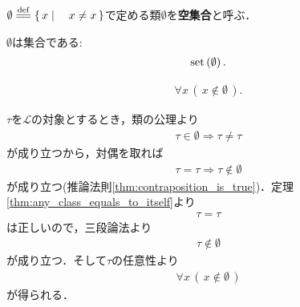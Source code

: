	\begin{screen}
		\begin{dfn}[空集合]
			$\emptyset \defeq \Set{x}{x \neq x}$で定める類$\emptyset$を{\bf 空集合}と呼ぶ．
		\end{dfn}
	\end{screen}
	
	\begin{screen}
		\begin{axm}[空集合の公理]
			$\emptyset$は集合である:
			\begin{align}
				\operatorname*{set} \left(\emptyset\right).
			\end{align}
		\end{axm}
	\end{screen}
	
	\begin{screen}
		\begin{thm}\label{thm:emptyset_has_nothing}
			\begin{align}
				\forall x\, (\, x \notin \emptyset\, ).
			\end{align}
		\end{thm}
	\end{screen}
	
	\begin{sketch}
		$\tau$を$\mathscr{L}$の対象とするとき，類の公理より
		\begin{align}
			\tau \in \emptyset \Longrightarrow \tau \neq \tau
		\end{align}
		が成り立つから，対偶を取れば
		\begin{align}
			\tau = \tau \Longrightarrow \tau \notin \emptyset
		\end{align}
		が成り立つ(推論法則\ref{thm:contraposition_is_true})．定理\ref{thm:any_class_equals_to_itself}より
		\begin{align}
			\tau = \tau
		\end{align}
		は正しいので，三段論法より
		\begin{align}
			\tau \notin \emptyset
		\end{align}
		が成り立つ．そして$\tau$の任意性より
		\begin{align}
			\forall x\, (\, x \notin \emptyset\, )
		\end{align}
		が得られる．
		\QED
	\end{sketch}
	
	
